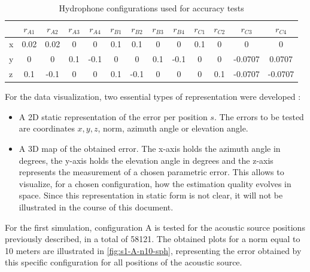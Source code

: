 \begin{table}[!htbp] %
	\begin{center}
		\begin{tabular}{ l | c c c c | c c c c | c c c c}
	    	\toprule
			\multicolumn{1}{c|}{} & $r_{A1}$ & $r_{A2}$ & $r_{A3}$ & $r_{A4}$ & $r_{B1}$ & $r_{B2}$ & $r_{B3}$ & $r_{B4}$ & $r_{C1}$ & $r_{C2}$ & $r_{C3}$ & $r_{C4}$ \\
			\midrule
			\multirow{1}{0.5em}{x} 
			& 0.02 & 0.02 & 0 & 0 & 0.1 & 0.1 & 0 & 0 & 0.1 & 0 & 0 & 0  \\
			\multirow{1}{0.5em}{y} 
			& 0 & 0 & 0.1 & -0.1 & 0 & 0 & 0.1 & -0.1 & 0 & 0 & -0.0707 & 0.0707 \\
			\multirow{1}{0.5em}{z} 
			& 0.1 & -0.1  & 0 & 0 & 0.1 & -0.1  & 0 & 0 & 0 & 0.1 & -0.0707  & -0.0707\\
			\bottomrule 
		\end{tabular}
		\caption{Hydrophone configurations used for accuracy tests}
		\label{tab:configs_test1}
	\end{center}
\end{table}

For the data visualization, two essential types of representation were developed :

\begin{itemize}
	\item A 2D static representation of the error per position $s$. The errors to be tested are coordinates $x, y, z$, norm, azimuth angle or elevation angle.
	
	\item A 3D map of the obtained error. The x-axis holds the azimuth angle in degrees, the y-axis holds the elevation angle in degrees and the z-axis represents the measurement of a chosen parametric error. This allows to visualize, for a chosen configuration, how the estimation quality evolves in space. Since this representation in static form is not clear, it will not be illustrated in the course of this document. 
	
\end{itemize}

For the first simulation, configuration A is tested for the acoustic source positions previously described, in a total of 58121. The obtained plots for a norm equal to 10 meters are illustrated in \ref{fig:s1-A-n10-sph}, representing the error obtained by this specific configuration for all positions of the acoustic source.

